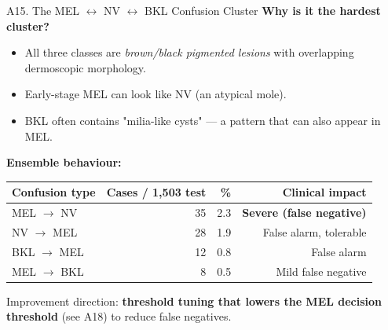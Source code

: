 \documentclass[10pt, aspectratio=169]{beamer}
\begin{document}
\begin{frame}{A15. The MEL $\leftrightarrow$ NV $\leftrightarrow$ BKL Confusion Cluster}
    \footnotesize
    \textbf{Why is it the hardest cluster?}
    \begin{itemize}
        \item All three classes are \textit{brown/black pigmented lesions} with overlapping dermoscopic morphology.
        \item Early-stage MEL can look like NV (an atypical mole).
        \item BKL often contains "milia-like cysts" --- a pattern that can also appear in MEL.
    \end{itemize}

    \vspace{0.2cm}
    \textbf{Ensemble behaviour:}
    \begin{table}[]
        \scriptsize \centering
        \begin{tabular}{lrrr}
        \toprule
        \rowcolor{usthblue!25} \textbf{Confusion type} & \textbf{Cases / 1,503 test} & \textbf{\%} & \textbf{Clinical impact} \\
        \midrule
        MEL $\rightarrow$ NV  & 35 & 2.3 & \textcolor{usthred}{\textbf{Severe (false negative)}} \\
        NV $\rightarrow$ MEL  & 28 & 1.9 & False alarm, tolerable \\
        BKL $\rightarrow$ MEL & 12 & 0.8 & False alarm \\
        MEL $\rightarrow$ BKL & 8  & 0.5 & Mild false negative \\
        \bottomrule
        \end{tabular}
    \end{table}

    \vspace{0.1cm}
    Improvement direction: \textbf{threshold tuning that lowers the MEL decision threshold} (see A18) to reduce false negatives.
\end{frame}
\end{document}
